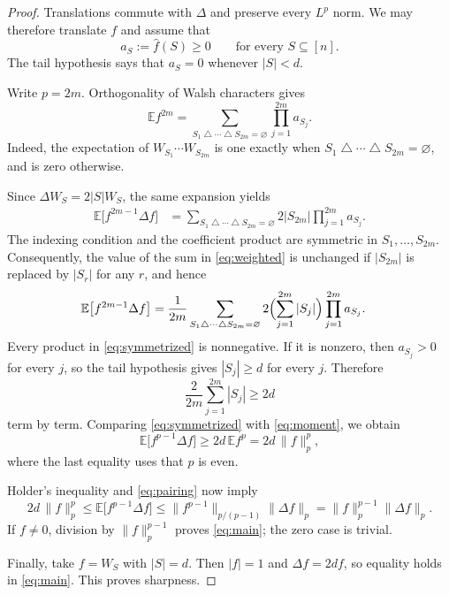 \documentclass[11pt]{article}
\newcommand{\E}{\mathbb{E}}
\newcommand{\wh}{\widehat}
\newcommand{\symdiff}{\mathbin{\triangle}}
\begin{document}
\begin{proof}
Translations commute with $\Delta$ and preserve every $L^p$ norm.  We may
therefore translate $f$ and assume that
\[
  a_S:=\wh f(S)\ge0
  \qquad\text{for every }S\subseteq[n].
\]
The tail hypothesis says that $a_S=0$ whenever $|S|<d$.

Write $p=2m$.  Orthogonality of Walsh characters gives
\begin{equation}\label{eq:moment}
  \E f^{2m}
  =
  \sum_{S_1\symdiff\cdots\symdiff S_{2m}=\varnothing}
  \prod_{j=1}^{2m} a_{S_j}.
\end{equation}
Indeed, the expectation of $W_{S_1}\cdots W_{S_{2m}}$ is one exactly when
$S_1\symdiff\cdots\symdiff S_{2m}=\varnothing$, and is zero otherwise.

Since $\Delta W_S=2|S|W_S$, the same expansion yields
\begin{align}
  \E\bigl[f^{2m-1}\Delta f\bigr]
  &=
  \sum_{S_1\symdiff\cdots\symdiff S_{2m}=\varnothing}
  2|S_{2m}|\prod_{j=1}^{2m} a_{S_j}. \label{eq:weighted}
\end{align}
The indexing condition and the coefficient product are symmetric in
$S_1,\ldots,S_{2m}$.  Consequently, the value of the sum in
\eqref{eq:weighted} is unchanged if $|S_{2m}|$ is replaced by $|S_r|$ for
any $r$, and hence
\begin{align}
  \E\bigl[f^{2m-1}\Delta f\bigr]
  &=\frac{1}{2m}
  \sum_{S_1\symdiff\cdots\symdiff S_{2m}=\varnothing}
  2\Bigl(\sum_{j=1}^{2m}|S_j|\Bigr)
  \prod_{j=1}^{2m}a_{S_j}. \label{eq:symmetrized}
\end{align}
Every product in \eqref{eq:symmetrized} is nonnegative.  If it is nonzero,
then $a_{S_j}>0$ for every $j$, so the tail hypothesis gives $|S_j|\ge d$
for every $j$.  Therefore
\[
  \frac{2}{2m}\sum_{j=1}^{2m}|S_j|\ge 2d
\]
term by term.  Comparing \eqref{eq:symmetrized} with \eqref{eq:moment},
we obtain
\begin{equation}\label{eq:pairing}
  \E\bigl[f^{p-1}\Delta f\bigr]
  \ge 2d\,\E f^p
  =2d\,\|f\|_p^p,
\end{equation}
where the last equality uses that $p$ is even.

Holder's inequality and \eqref{eq:pairing} now imply
\[
  2d\,\|f\|_p^p
  \le \E\bigl[f^{p-1}\Delta f\bigr]
  \le \|f^{p-1}\|_{p/(p-1)}\|\Delta f\|_p
  =\|f\|_p^{p-1}\|\Delta f\|_p.
\]
If $f\ne0$, division by $\|f\|_p^{p-1}$ proves \eqref{eq:main}; the zero
case is trivial.

Finally, take $f=W_S$ with $|S|=d$.  Then $|f|=1$ and
$\Delta f=2d f$, so equality holds in \eqref{eq:main}.  This proves
sharpness.
\end{proof}
\end{document}
